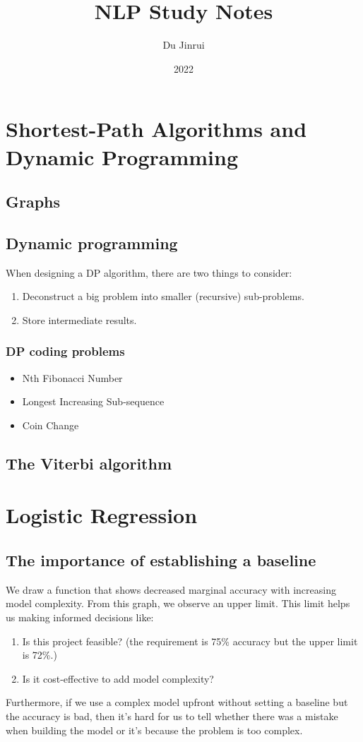 \documentclass{report}
\title{NLP Study Notes}
\author{Du Jinrui}
\date{2022} \usepackage[b6paper, margin=0.5in]{geometry}
\begin{document}
  \maketitle
  \tableofcontents
  \chapter{Shortest-Path Algorithms and Dynamic Programming}
  \section{Graphs}
  \section{Dynamic programming}
  When designing a DP algorithm, there are two things to consider:
  \begin{enumerate}
  	\item Deconstruct a big problem into smaller (recursive) sub-problems.
	\item Store intermediate results.
  \end{enumerate}
  \subsection{DP coding problems}
  \begin{itemize}
    \item Nth Fibonacci Number
    \item Longest Increasing Sub-sequence
    \item Coin Change
  \end{itemize}
  \section{The Viterbi algorithm}

  \chapter{Logistic Regression}
  \section{The importance of establishing a baseline}
  We draw a function that shows decreased marginal accuracy with increasing model complexity. From this graph, we observe an upper limit. This limit helps us making informed decisions like:
		\begin{enumerate}
			\item Is this project feasible? (the requirement is 75\% accuracy but the upper limit is 72\%.)
			\item Is it cost-effective to add model complexity?
		\end{enumerate}
Furthermore, if we use a complex model upfront without setting a baseline but the accuracy is bad, then it's hard for us to tell whether there was a mistake when building the model or it's because the problem is too complex.
\end{document}
